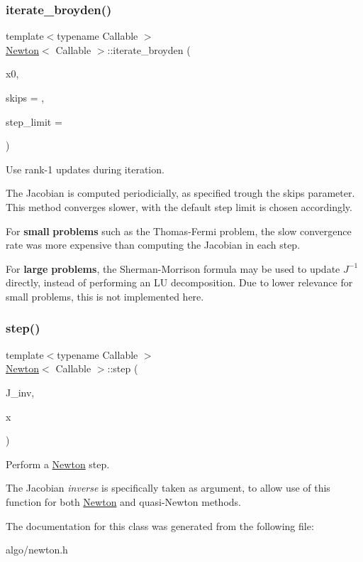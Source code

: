 \subsubsection{\texorpdfstring{iterate\+\_\+broyden()}{iterate\_broyden()}}
{\footnotesize\ttfamily template$<$typename Callable $>$ \\
\hyperlink{classNewton}{Newton}$<$ Callable $>$\+::iterate\+\_\+broyden (\begin{DoxyParamCaption}\item[{const Vector\+D2 \&}]{x0,  }\item[{size\+\_\+t}]{skips = {},  }\item[{size\+\_\+t}]{step\+\_\+limit = {} }\end{DoxyParamCaption})\hspace{0.3cm}{\ttfamily [inline]}}



Use rank-\/1 updates during iteration. 

The Jacobian is computed periodicially, as specified trough the {\ttfamily skips} parameter. This method converges slower, with the default step limit is chosen accordingly.

For {\bfseries small} {\bfseries problems} such as the Thomas-\/\+Fermi problem, the slow convergence rate was more expensive than computing the Jacobian in each step.

For {\bfseries large} {\bfseries problems}, the Sherman-\/\+Morrison formula may be used to update $J^{-1}$ directly, instead of performing an LU decomposition. Due to lower relevance for small problems, this is not implemented here. \mbox{\label{classNewton_a6331f82a3fb26379f95ac4dc82b2305f}} 
\subsubsection{\texorpdfstring{step()}{step()}}
{\footnotesize\ttfamily template$<$typename Callable $>$ \\
\hyperlink{classNewton}{Newton}$<$ Callable $>$\+::step (\begin{DoxyParamCaption}\item[{const Matrix\+D2 \&}]{J\+\_\+inv,  }\item[{Vector\+D2 \&}]{x }\end{DoxyParamCaption})\hspace{0.3cm}{\ttfamily [inline]}}



Perform a \hyperlink{classNewton}{Newton} step. 

The Jacobian {\itshape inverse} is specifically taken as argument, to allow use of this function for both \hyperlink{classNewton}{Newton} and quasi-\/\+Newton methods. 

The documentation for this class was generated from the following file\+:\begin{DoxyCompactItemize}
\item 
algo/newton.\+h\end{DoxyCompactItemize}
